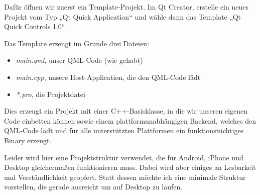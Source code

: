 \documentclass[a4paper]{article}
\begin{document}
Dafür öffnen wir zuerst ein Template-Projekt. Im Qt Creator, erstelle ein neues Projekt vom Typ „Qt Quick Application“ und wähle dann das Template „Qt Quick Controls 1.0“.

Das Template erzeugt im Grunde drei Dateien:
\begin{itemize}
\item \emph{main.qml}, unser QML-Code (wie gehabt)
\item \emph{main.cpp}, unsere Host-Application, die den QML-Code lädt
\item \emph{*.pro}, die Projektdatei
\end{itemize}

Dies erzeugt ein Projekt mit einer C++-Basisklasse, in die wir unseren eigenen Code einbetten können sowie einem plattformunabhängigen Backend, welches den QML-Code lädt und für alle unterstützten Plattformen ein funktionstüchtiges Binary erzeugt.

Leider wird hier eine Projektstruktur verwendet, die für Android, iPhone und Desktop gleichermaßen funktionieren muss. Dabei wird aber einiges an Lesbarkeit und Verständlichkeit geopfert. Statt dessen möchte ich eine minimale Struktur vorstellen, die gerade ausreicht um auf Desktop zu laufen.
\end{document}
